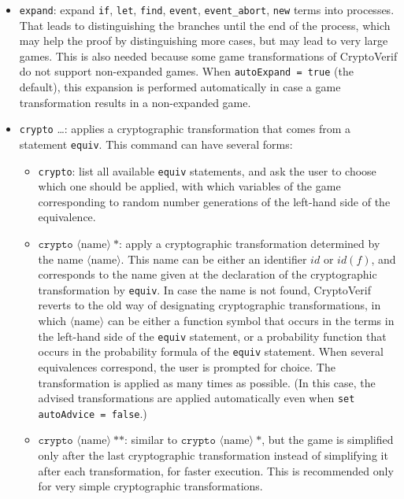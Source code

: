 \documentclass{article}
\newcommand{\nonterm}[1]{\langle\textrm{#1}\rangle}
\begin{document}
\begin{itemize}
\item \texttt{expand}: expand \texttt{if}, \texttt{let}, \texttt{find},
\texttt{event}, \texttt{event\_abort}, \texttt{new} terms into processes.
That leads to distinguishing the branches until the end of the process,
which may help the proof by distinguishing more cases, but
may lead to very large games.
This is also needed because some game transformations of CryptoVerif
do not support non-expanded games.
When \texttt{autoExpand = true} (the default), this expansion
is performed automatically in case a game transformation results
in a non-expanded game. 

\item \texttt{crypto} \ldots: applies a cryptographic transformation
that comes from a statement \texttt{equiv}. This command can
have several forms:
\begin{itemize}

\item \texttt{crypto}: list all available \texttt{equiv} statements,
and ask the user to choose which one should be applied, 
with which variables of the game corresponding to random number generations
of the left-hand side of the equivalence.

\item $\texttt{crypto }\nonterm{name}\ \texttt{*}$: apply a cryptographic
transformation determined by the name $\nonterm{name}$. 
This name can be either an identifier $\mathit{id}$ or $\mathit{id}(f)$, 
and corresponds to the name given at the declaration of the 
cryptographic transformation by \texttt{equiv}.
In case the name is not found, CryptoVerif reverts to the
old way of designating cryptographic transformations, in which
$\nonterm{name}$ can be either a
function symbol that occurs in the terms in the left-hand side of the
\texttt{equiv} statement, or a probability function that occurs in the
probability formula of the \texttt{equiv} statement.
When several equivalences correspond, the user is prompted for choice.
The transformation is applied as many times as possible. (In this
case, the advised transformations are applied automatically even when
\texttt{set autoAdvice = false}.)

\item $\texttt{crypto }\nonterm{name}\ \texttt{**}$: similar to 
$\texttt{crypto }\nonterm{name}\ \texttt{*}$, but the game is simplified
only after the last cryptographic transformation instead of simplifying it
after each transformation, for faster execution. This is recommended
only for very simple cryptographic transformations.


\end{itemize}
\end{itemize}
\end{document}
